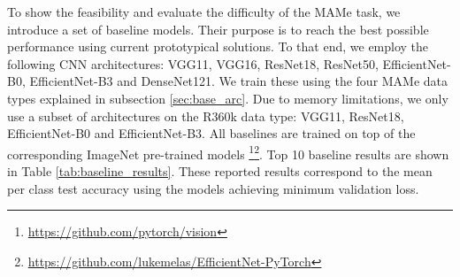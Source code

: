 \documentclass{article}
\begin{document}
To show the feasibility and evaluate the difficulty of the MAMe task, we introduce a set of baseline models. Their purpose is to reach the best possible performance using current prototypical solutions. To that end, we employ the following CNN architectures: VGG11, VGG16, ResNet18, ResNet50, EfficientNet-B0, EfficientNet-B3 and DenseNet121. We train these using the four MAMe data types explained in subsection \ref{sec:base_arc}. Due to memory limitations, we only use a subset of architectures on the R360k data type: VGG11, ResNet18, EfficientNet-B0 and EfficientNet-B3. All baselines are trained on top of the corresponding ImageNet pre-trained models \footnote{\url{https://github.com/pytorch/vision}}\footnote{\url{https://github.com/lukemelas/EfficientNet-PyTorch}}. Top 10 baseline results are shown in Table \ref{tab:baseline_results}. These reported results correspond to the mean per class test accuracy using the models achieving minimum validation loss.
\end{document}
